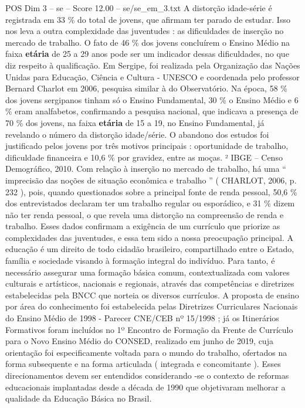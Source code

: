 \begin{textsample}{POS Dim 3 – se – Score 12.00 – se/se\_em\_3.txt}
A distorção idade-série é registrada em 33 \% do total de jovens, que afirmam ter parado de estudar.
Isso nos leva a outra complexidade das juventudes : as dificuldades de inserção no mercado de trabalho.
O fato de 46 \% dos jovens concluírem o Ensino Médio na faixa \textbf{etária} de 25 a 29 anos pode ser um indicador dessas dificuldades, no que diz respeito à qualificação.
Em Sergipe, foi realizada pela Organização das Nações Unidas para Educação, Ciência e Cultura - UNESCO e coordenada pelo professor Bernard Charlot em 2006, pesquisa similar à do Observatório.
Na época, 58 \% dos jovens sergipanos tinham só o Ensino Fundamental, 30 \% o Ensino Médio e 6 \% eram analfabetos, confirmando a pesquisa nacional, que indicava a presença de 70 \% dos jovens, na faixa \textbf{etária} de 15 a 19, no Ensino Fundamental, já revelando o número da distorção idade/série.
O abandono dos estudos foi justificado pelos jovens por três motivos principais : oportunidade de trabalho, dificuldade financeira e 10,6 \% por gravidez, entre as moças. ² IBGE – Censo Demográfico, 2010.
Com relação à inserção no mercado de trabalho, há uma “ imprecisão das noções de situação econômica e trabalho ” ( CHARLOT, 2006, p. 232 ), pois, quando questionados sobre a principal fonte de renda pessoal, 50,6 \% dos entrevistados declaram ter um trabalho regular ou esporádico, e 31 \% dizem não ter renda pessoal, o que revela uma distorção na compreensão de renda e trabalho.
Esses dados confirmam a exigência de um currículo que priorize as complexidades das juventudes, e essa tem sido a nossa preocupação principal.
A educação é um direito de todo cidadão brasileiro, compartilhado entre o Estado, família e sociedade visando à formação integral do indivíduo.
Para tanto, é necessário assegurar uma formação básica comum, contextualizada com valores culturais e artísticos, nacionais e regionais, através das competências e diretrizes estabelecidas pela BNCC que norteia os diversos currículos.
A proposta de ensino por área do conhecimento foi estabelecida pelas Diretrizes Curriculares Nacionais do Ensino Médio de 1998 - Parecer CNE/CEB nº 15/1998 ; já os Itinerários Formativos foram incluídos no 1º Encontro de Formação da Frente de Currículo para o Novo Ensino Médio do CONSED, realizado em junho de 2019, cuja orientação foi especificamente voltada para o mundo do trabalho, ofertados na forma subsequente e na forma articulada ( integrada e concomitante ).
Esses direcionamentos devem ser entendidos considerando -se o contexto de reformas educacionais implantadas desde a década de 1990 que objetivaram melhorar a qualidade da Educação Básica no Brasil.

\end{textsample}
